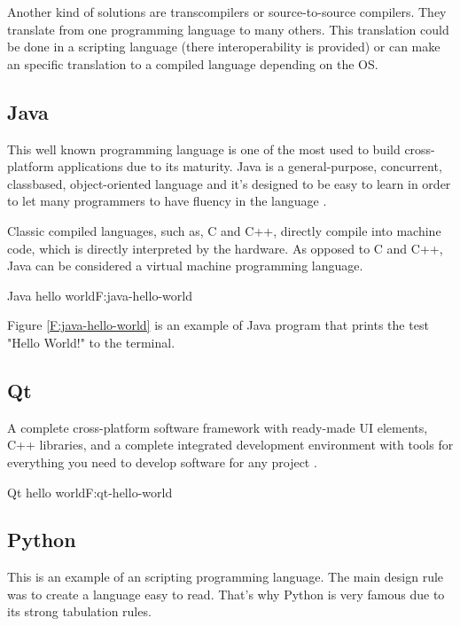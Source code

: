 Another kind of solutions are transcompilers or source-to-source compilers. They 
translate from one programming language to many others. This translation could 
be done in a scripting language (there interoperability is provided) or can make
an specific translation to a compiled language depending on the OS.

\subsection{Java}

This well known programming language is one of the most used to build
cross-platform applications due to its maturity. Java is a general-purpose,
concurrent, classbased, object-oriented language and it's designed to be easy
to learn in order to let many programmers to have fluency in the language
\cite{java-8-specs}.

Classic compiled languages, such as, C and C++, directly compile into machine
code, which is directly interpreted by the hardware. As opposed to C and C++,
Java can be considered a virtual machine programming language.

\begin{codefigure}{Java hello world}{F:java-hello-world}
\end{codefigure}

Figure \ref{F:java-hello-world} is an example of Java program that prints the
test "Hello World!" to the terminal.

\subsection{Qt}

A complete cross-platform software framework with ready-made UI elements, C++ 
libraries, and a complete integrated development environment with tools for 
everything you need to develop software for any project \cite{qt-web}.

\begin{codefigure}{Qt hello world}{F:qt-hello-world}
\end{codefigure}

\subsection{Python}

This is an example of an scripting programming language. The main design rule
was to create a language easy to read. That's why Python is very famous due to
its strong tabulation rules.

